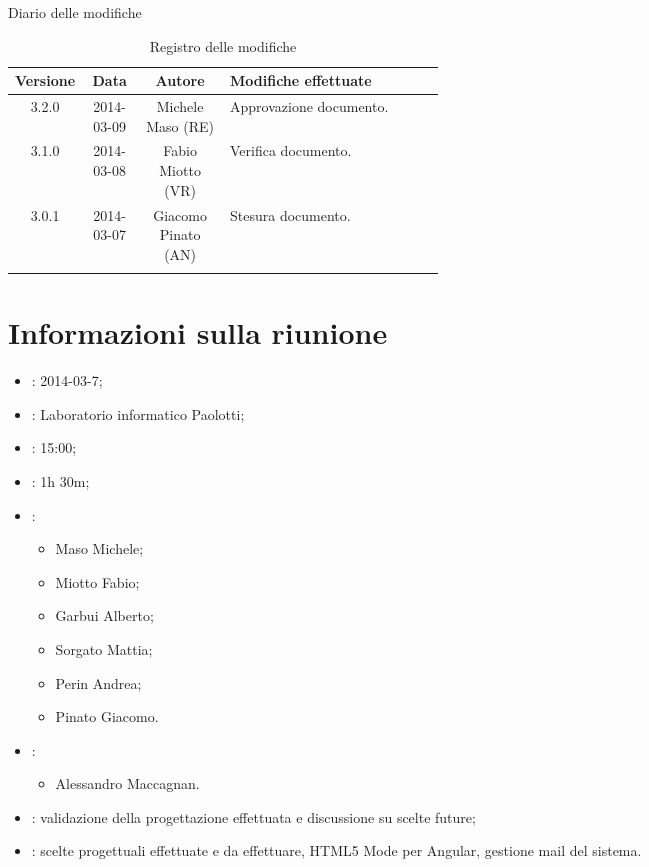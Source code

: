 
\newpage
Diario delle modifiche
\begin{center}
\begin{longtable}{|c|c|c|p{0.5\linewidth}|}
\toprule
\textbf{Versione} & \textbf{Data} & \textbf{Autore} & \textbf{Modifiche effettuate}\\

\midrule
3.2.0 & 2014-03-09 & Michele Maso (RE)  & Approvazione documento.\\
\midrule
3.1.0 & 2014-03-08 & Fabio Miotto (VR) & Verifica documento.\\
\midrule
3.0.1 & 2014-03-07 & Giacomo Pinato (AN) & Stesura documento.\\

\bottomrule
\caption{Registro delle modifiche}
\label{tab:changelog}
\end{longtable}
\end{center}

\newpage
\tableofcontents


\newpage
\section{Informazioni sulla riunione}%
\label{1.0}
\begin{itemize}
\item {}: 2014-03-7;
\item {}: Laboratorio informatico Paolotti;
\item {}: 15:00;
\item {}: 1h 30m;
\item {}: \NomeGruppo{}
\begin{itemize}
\item Maso Michele;
\item Miotto Fabio;
\item Garbui Alberto;
\item Sorgato Mattia;
\item Perin Andrea;
\item Pinato Giacomo.
\end{itemize}
\item {}:
\begin{itemize}
\item Alessandro Maccagnan.
\end{itemize}
\item {}: validazione della progettazione effettuata e discussione su scelte future;
\item {}: scelte progettuali effettuate e da effettuare, HTML5 Mode per Angular, gestione mail del sistema.
\end{itemize}

